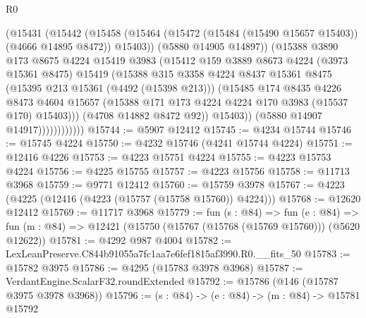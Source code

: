 \begin{lexlean}{R0}
\begin{coremodule}
                          (@15431
                            (@15442
                              (@15458
                                (@15464
                                  (@15472 (@15484 (@15490 @15657 @15403)) (@4666 @14895 @8472))
                                  @15403))
                              (@5880 @14905 @14897))
                            (@15388
                              @3890
                              @173
                              @8675
                              @4224
                              @15419
                              @3983
                              (@15412
                                @159
                                @3889
                                @8673
                                @4224
                                (@3973 @15361 @8475)
                                @15419
                                (@15388
                                  @315
                                  @3358
                                  @4224
                                  @8437
                                  @15361
                                  @8475
                                  (@15395 @213 @15361 (@4492 (@15398 @213)))
                                  (@15485
                                    @174
                                    @8435
                                    @4226
                                    @8473
                                    @4604
                                    @15657
                                    (@15388 @171 @173 @4224 @4224 @170 @3983 (@15537 @170) @15403)))
                                (@4708 @14882 @8472 @92))
                              @15403))
                          (@5880 @14907 @14917))))))))))))
@15744 := @5907 @12412
@15745 := @4234 @15744
@15746 := @15745 @4224
@15750 := @4232 @15746 (@4241 @15744 @4224)
@15751 := @12416 @4226
@15753 := @4223 @15751 @4224
@15755 := @4223 @15753 @4224
@15756 := @4225 @15755
@15757 := @4223 @15756
@15758 := @11713 @3968
@15759 := @9771 @12412
@15760 := @15759 @3978
@15767 := @4223 (@4225 (@12416 (@4223 (@15757 (@15758 @15760)) @4224)))
@15768 := @12620 @12412
@15769 := @11717 @3968
@15779 := fun (s : @84) =>
  fun (e : @84) => fun (m : @84) => @12421 (@15750 (@15767 (@15768 (@15769 @15760))) (@5620 @12622))
@15781 := @4292 @987 @4004
@15782 := LexLeanPreserve.C844b91055a7fc1aa7e6fef1815af3990.R0.__fits_50
@15783 := @15782 @3975
@15786 := @4295 (@15783 @3978 @3968)
@15787 := VerdantEngine.ScalarF32.roundExtended
@15792 := @15786 (@146 (@15787 @3975 @3978 @3968))
@15796 := (s : @84) -> (e : @84) -> (m : @84) -> @15781 @15792

\end{coremodule}
\end{lexlean}
